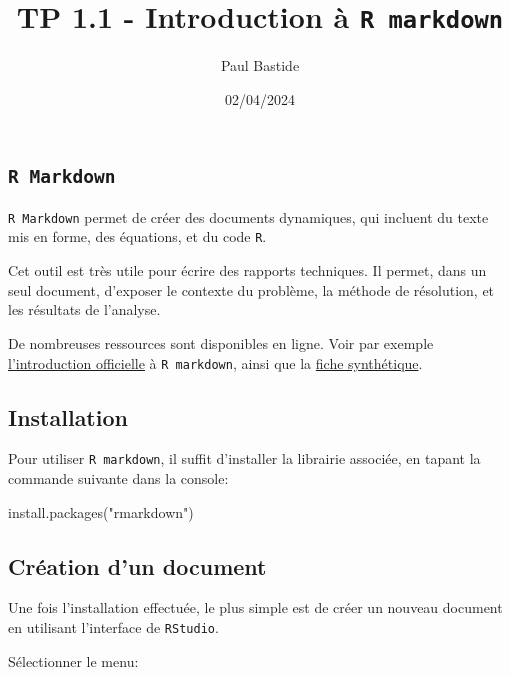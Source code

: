 \documentclass[
]{article}
\title{TP 1.1 - Introduction à \texttt{R\ markdown}}
\author{Paul Bastide}
\date{02/04/2024}
\newenvironment{Shaded}{\begin{snugshade}}{\end{snugshade}}
\newcommand{\FunctionTok}[1]{\textcolor[rgb]{0.00,0.00,0.00}{#1}}
\newcommand{\NormalTok}[1]{#1}
\newcommand{\StringTok}[1]{\textcolor[rgb]{0.31,0.60,0.02}{#1}}
\begin{document}
\maketitle

\hypertarget{r-markdown}{%
\subsection{\texorpdfstring{\texttt{R\ Markdown}}{R Markdown}}\label{r-markdown}}

\texttt{R\ Markdown} permet de créer des documents dynamiques, qui
incluent du texte mis en forme, des équations, et du code \texttt{R}.

Cet outil est très utile pour écrire des rapports techniques. Il permet,
dans un seul document, d'exposer le contexte du problème, la méthode de
résolution, et les résultats de l'analyse.

De nombreuses ressources sont disponibles en ligne. Voir par exemple
\href{https://rmarkdown.rstudio.com/lesson-1.html}{l'introduction
officielle} à \texttt{R\ markdown}, ainsi que la
\href{https://raw.githubusercontent.com/rstudio/cheatsheets/master/rmarkdown-2.0.pdf}{fiche
synthétique}.

\hypertarget{installation}{%
\subsection{Installation}\label{installation}}

Pour utiliser \texttt{R\ markdown}, il suffit d'installer la librairie
associée, en tapant la commande suivante dans la console:

\begin{Shaded}
\begin{Highlighting}[]
\FunctionTok{install.packages}\NormalTok{(}\StringTok{"rmarkdown"}\NormalTok{)}
\end{Highlighting}
\end{Shaded}

\hypertarget{cruxe9ation-dun-document}{%
\subsection{Création d'un document}\label{cruxe9ation-dun-document}}

Une fois l'installation effectuée, le plus simple est de créer un
nouveau document en utilisant l'interface de \texttt{RStudio}.

Sélectionner le menu:
\end{document}
